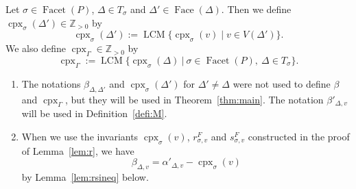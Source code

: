 \documentclass[11pt]{article}
\theoremstyle{definition}
\numberwithin{equation}{section}
\begin{document}
Let $\sigma \in \operatorname{Facet}(P)$, $\Delta \in T_{\sigma}$ and $\Delta ' \in \operatorname{Face}(\Delta)$. 
Then we define $\operatorname{cpx}_{\sigma}(\Delta ') \in \mathbb{Z}_{>0}$ by 
\[
\operatorname{cpx}_{\sigma}(\Delta ') := 
\operatorname{LCM}\{ \operatorname{cpx}_{\sigma}(v) \mid v \in V(\Delta ') \}. 
\]
We also define $\operatorname{cpx}_{\Gamma} \in \mathbb{Z}_{>0}$ by
\[
\operatorname{cpx}_{\Gamma} :=
\operatorname{LCM} \bigl\{ \operatorname{cpx}_{\sigma}(\Delta) \ \big | \ \sigma \in \operatorname{Facet}(P),\ \Delta \in T_{\sigma} \bigr \}. 
\]


\begin{rmk}\label{rmk:ineq}
\begin{enumerate}
\item 
The notations $\beta _{\Delta, \Delta '}$ and $\operatorname{cpx}_{\sigma}(\Delta ')$ for $\Delta ' \not = \Delta$ 
were not used to define $\beta$ and $\operatorname{cpx}_{\Gamma}$, but they will be used in Theorem~\ref{thm:main}. 
The notation $\beta ' _{\Delta, v}$ will be used in Definition~\ref{defi:M}. 

\item
When we use the invariants $\operatorname{cpx}_{\sigma}(v)$, $r_{\sigma, v}^F$ and $s_{\sigma, v}^F$ constructed in the proof of Lemma~\ref{lem:r}, we have 
\[
\beta_{\Delta, v} = \alpha ' _{\Delta, v} - \operatorname{cpx}_{\sigma}(v)
\]
by Lemma~\ref{lem:rsineq} below. 
\end{enumerate}
\end{rmk}
\end{document}
